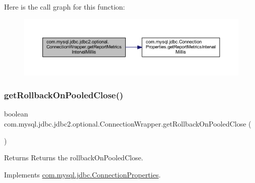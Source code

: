 Here is the call graph for this function\+:
\nopagebreak
\begin{figure}[H]
\begin{center}
\leavevmode
\includegraphics[width=350pt]{classcom_1_1mysql_1_1jdbc_1_1jdbc2_1_1optional_1_1_connection_wrapper_a5f6c8e0cebe816e8612a1b3bdd418e3e_cgraph}
\end{center}
\end{figure}
\mbox{\label{classcom_1_1mysql_1_1jdbc_1_1jdbc2_1_1optional_1_1_connection_wrapper_ada2984ed24a32bb5d13aff48689757d9}} 
\subsubsection{\texorpdfstring{get\+Rollback\+On\+Pooled\+Close()}{getRollbackOnPooledClose()}}
{\footnotesize\ttfamily boolean com.\+mysql.\+jdbc.\+jdbc2.\+optional.\+Connection\+Wrapper.\+get\+Rollback\+On\+Pooled\+Close (\begin{DoxyParamCaption}{ }\end{DoxyParamCaption})}

\begin{DoxyReturn}{Returns}
Returns the rollback\+On\+Pooled\+Close. 
\end{DoxyReturn}


Implements \mbox{\hyperlink{interfacecom_1_1mysql_1_1jdbc_1_1_connection_properties_a8b670aa700956797a853c145974cd285}{com.\+mysql.\+jdbc.\+Connection\+Properties}}.

